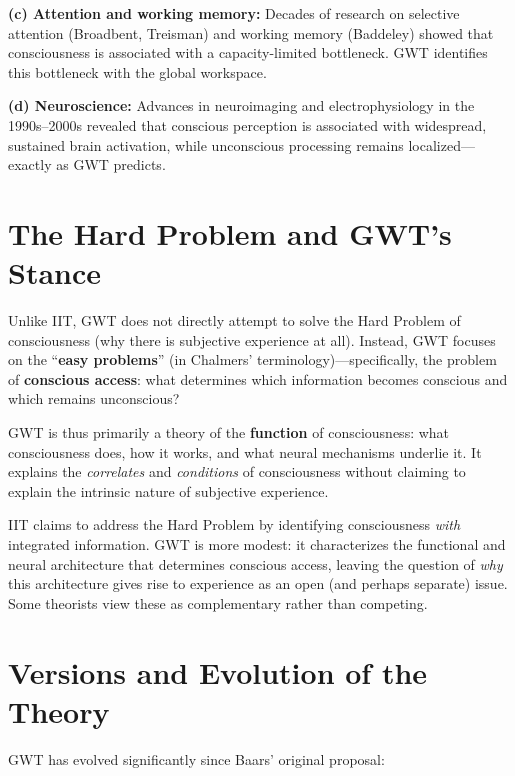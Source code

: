 \documentclass[11pt,a4paper]{report}
\begin{document}
\textbf{(c) Attention and working memory:} Decades of research on selective attention (Broadbent, Treisman) and working memory (Baddeley) showed that consciousness is associated with a capacity-limited bottleneck. GWT identifies this bottleneck with the global workspace.

\textbf{(d) Neuroscience:} Advances in neuroimaging and electrophysiology in the 1990s--2000s revealed that conscious perception is associated with widespread, sustained brain activation, while unconscious processing remains localized---exactly as GWT predicts.

\section{The Hard Problem and GWT's Stance}

Unlike IIT, GWT does not directly attempt to solve the Hard Problem of consciousness (why there is subjective experience at all). Instead, GWT focuses on the ``\textbf{easy problems}'' (in Chalmers' terminology)---specifically, the problem of \textbf{conscious access}: what determines which information becomes conscious and which remains unconscious?

GWT is thus primarily a theory of the \textbf{function} of consciousness: what consciousness does, how it works, and what neural mechanisms underlie it. It explains the \emph{correlates} and \emph{conditions} of consciousness without claiming to explain the intrinsic nature of subjective experience.

\begin{notebox}
IIT claims to address the Hard Problem by identifying consciousness \emph{with} integrated information. GWT is more modest: it characterizes the functional and neural architecture that determines conscious access, leaving the question of \emph{why} this architecture gives rise to experience as an open (and perhaps separate) issue. Some theorists view these as complementary rather than competing.
\end{notebox}

\section{Versions and Evolution of the Theory}

GWT has evolved significantly since Baars' original proposal:
\end{document}
